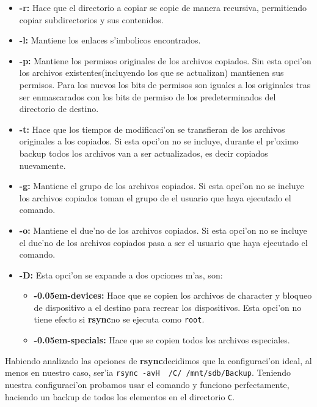 \documentclass[11pt]{article}
\newcommand{\rsync}[0]{\textbf{rsync}}
\newcommand{\customitem}[1]{\item \textbf{#1:}}
\begin{document}
		\begin{itemize}
			\customitem{-r} Hace que el directorio a copiar se copie de manera recursiva, permitiendo copiar subdirectorios y sus contenidos.
			\customitem{-l} Mantiene los enlaces s'imbolicos encontrados.
			\customitem{-p} Mantiene los permisos originales de los archivos copiados. Sin esta opci'on los archivos existentes(incluyendo los que se actualizan) mantienen sus permisos. Para los nuevos los bits de permisos son iguales a los originales tras ser enmascarados con los bits de permiso de los predeterminados del directorio de destino.
			\customitem{-t} Hace que los tiempos de modificaci'on se transfieran de los archivos originales a los copiados. Si esta opci'on no se incluye, durante el pr'oximo backup todos los archivos van a ser actualizados, es decir copiados nuevamente.
			\customitem{-g} Mantiene el grupo de los archivos copiados. Si esta opci'on no se incluye los archivos copiados toman el grupo de el usuario que haya ejecutado el comando.
			\customitem{-o} Mantiene el due'no de los archivos copiados. Si esta opci'on no se incluye el due'no de los archivos copiados pasa a ser el usuario que haya ejecutado el comando.
			\customitem{-D} Esta opci'on se expande a dos opciones m'as, son:
			\begin{itemize}
				\customitem{-{\kern 0.05em}-devices} Hace que se copien los archivos de character y bloqueo de dispositivo a el destino para recrear los dispositivos. Esta opci'on no tiene efecto si \rsync no se ejecuta como \texttt{root}.
				\customitem{-{\kern 0.05em}-specials} Hace que se copien todos los archivos especiales.
			\end{itemize}
		\end{itemize}

		Habiendo analizado las opciones de \rsync decidimos que la configuraci'on ideal, al menos en nuestro caso, ser'ia \texttt{rsync -avH ~/C/ /mnt/sdb/Backup}. Teniendo nuestra configuraci'on probamos usar el comando y funciono perfectamente, haciendo un backup de todos los elementos en el directorio \texttt{C}.
\end{document}

